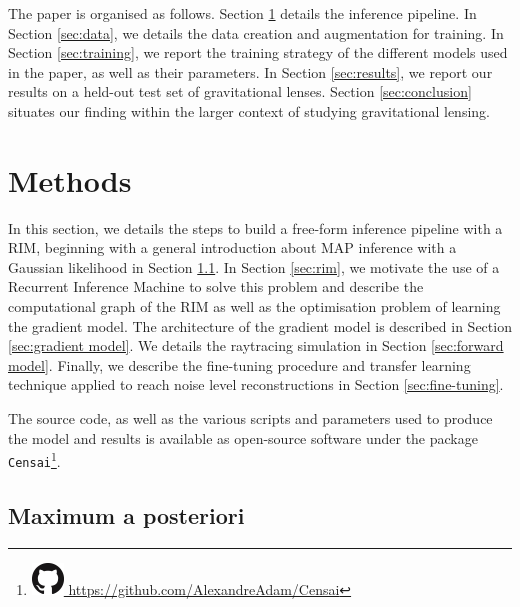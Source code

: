 \documentclass[twocolumn]{aastex631}
\begin{document}
The paper is organised as follows. Section \ref{sec:methods} details 
the inference pipeline. In Section \ref{sec:data}, we details the 
data creation and augmentation for training. In Section \ref{sec:training}, 
we report the training strategy of the different models used in 
the paper, as well as their parameters. In Section \ref{sec:results}, 
we report our results on a held-out test set of gravitational lenses. Section 
\ref{sec:conclusion} situates our finding within the larger context of 
studying gravitational lensing.


\section{Methods}\label{sec:methods}
In this section, we details the steps to build a free-form inference pipeline 
with a RIM, beginning with a general introduction about MAP inference 
with a Gaussian likelihood in Section \ref{sec:maximum a posteriori}. 
In Section \ref{sec:rim}, we motivate the use of a Recurrent Inference Machine 
to solve this problem and describe the computational graph of the RIM as 
well as the optimisation problem of learning the gradient model. 
The architecture of the gradient model is described in Section 
\ref{sec:gradient model}. We details the raytracing simulation 
in Section \ref{sec:forward model}. Finally, 
we describe the fine-tuning procedure and transfer learning technique 
applied to reach noise level reconstructions in Section \ref{sec:fine-tuning}.

The source code, as well as the various scripts and parameters used to 
produce the model and results is available as open-source software 
under the package \texttt{Censai}\footnote{
\href{https://github.com/AlexandreAdam/Censai}{
\includegraphics[scale=0.25]{figures/GitHub-Mark-32px.png}
https://github.com/AlexandreAdam/Censai}}. 



\subsection{Maximum a posteriori}\label{sec:maximum a posteriori}
\end{document}
